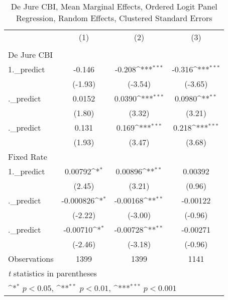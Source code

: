 \begin{table}[htbp]\centering
\def\sym#1{\ifmmode^{#1}\else\(^{#1}\)\fi}
\caption{De Jure CBI, Mean Marginal Effects, Ordered Logit Panel Regression, Random Effects, Clustered Standard Errors \label{ordLogDJ}}
\begin{tabular}{l*{3}{c}}
\toprule
                                        &\multicolumn{1}{c}{(1)}&\multicolumn{1}{c}{(2)}&\multicolumn{1}{c}{(3)}\\
                                        &\multicolumn{1}{c}{}&\multicolumn{1}{c}{}&\multicolumn{1}{c}{}\\
\midrule
De Jure CBI                             &                  &                  &                  \\
1.\_predict                              &   -0.146         &   -0.208\sym{***}&   -0.316\sym{***}\\
                                        &  (-1.93)         &  (-3.54)         &  (-3.65)         \\
\addlinespace
2.\_predict                              &   0.0152         &   0.0390\sym{***}&   0.0980\sym{**} \\
                                        &   (1.80)         &   (3.32)         &   (3.21)         \\
\addlinespace
3.\_predict                              &    0.131         &    0.169\sym{***}&    0.218\sym{***}\\
                                        &   (1.93)         &   (3.47)         &   (3.68)         \\
\midrule
Fixed Rate                              &                  &                  &                  \\
1.\_predict                              &  0.00792\sym{*}  &  0.00896\sym{**} &  0.00392         \\
                                        &   (2.45)         &   (3.21)         &   (0.96)         \\
\addlinespace
2.\_predict                              &-0.000826\sym{*}  & -0.00168\sym{**} & -0.00122         \\
                                        &  (-2.22)         &  (-3.00)         &  (-0.96)         \\
\addlinespace
3.\_predict                              & -0.00710\sym{*}  & -0.00728\sym{**} & -0.00271         \\
                                        &  (-2.46)         &  (-3.18)         &  (-0.96)         \\
\midrule
Observations                            &     1399         &     1399         &     1141         \\
\bottomrule
\multicolumn{4}{l}{\footnotesize \textit{t} statistics in parentheses}\\
\multicolumn{4}{l}{\footnotesize \sym{*} \(p<0.05\), \sym{**} \(p<0.01\), \sym{***} \(p<0.001\)}\\
\end{tabular}
\end{table}
